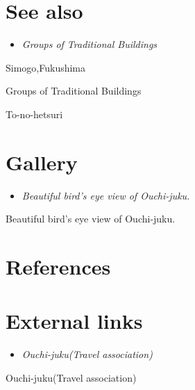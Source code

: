 \section{See also}\label{see-also}

\begin{itemize}
\item
  \emph{Groups of Traditional Buildings}
\end{itemize}

Simogo,Fukushima

Groups of Traditional Buildings

To-no-hetsuri

\section{Gallery}\label{gallery}

\begin{itemize}
\item
  \emph{Beautiful bird's eye view of Ouchi-juku.}
\end{itemize}

Beautiful bird's eye view of Ouchi-juku.

\section{References}\label{references}

\section{External links}\label{external-links}

\begin{itemize}
\item
  \emph{Ouchi-juku(Travel association)}
\end{itemize}

Ouchi-juku(Travel association)
